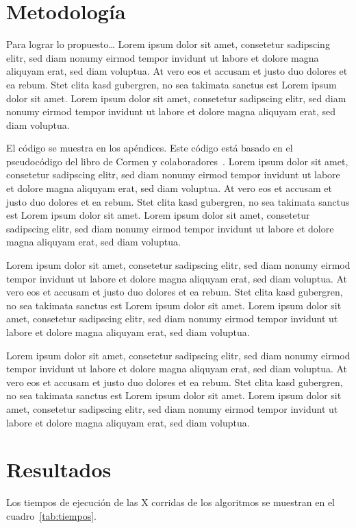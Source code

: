 \documentclass[twocolumn,english,spanish,journal]{IEEEtran}
\begin{document}
\section{Metodología}

Para lograr lo propuesto\ldots{} Lorem ipsum dolor sit amet, consetetur sadipscing elitr, sed diam nonumy eirmod tempor invidunt ut labore et dolore magna aliquyam erat, sed diam voluptua. At vero eos et accusam et justo duo dolores et ea rebum. Stet clita kasd gubergren, no sea takimata sanctus est Lorem ipsum dolor sit amet. Lorem ipsum dolor sit amet, consetetur sadipscing elitr, sed diam nonumy eirmod tempor invidunt ut labore et dolore magna aliquyam erat, sed diam voluptua.

El código se muestra en los apéndices. Este código está basado en el pseudocódigo del libro de Cormen y colaboradores~\cite{Cormen:2009}. Lorem ipsum dolor sit amet, consetetur sadipscing elitr, sed diam nonumy eirmod tempor invidunt ut labore et dolore magna aliquyam erat, sed diam voluptua. At vero eos et accusam et justo duo dolores et ea rebum. Stet clita kasd gubergren, no sea takimata sanctus est Lorem ipsum dolor sit amet. Lorem ipsum dolor sit amet, consetetur sadipscing elitr, sed diam nonumy eirmod tempor invidunt ut labore et dolore magna aliquyam erat, sed diam voluptua.

Lorem ipsum dolor sit amet, consetetur sadipscing elitr, sed diam nonumy eirmod tempor invidunt ut labore et dolore magna aliquyam erat, sed diam voluptua. At vero eos et accusam et justo duo dolores et ea rebum. Stet clita kasd gubergren, no sea takimata sanctus est Lorem ipsum dolor sit amet. Lorem ipsum dolor sit amet, consetetur sadipscing elitr, sed diam nonumy eirmod tempor invidunt ut labore et dolore magna aliquyam erat, sed diam voluptua.

Lorem ipsum dolor sit amet, consetetur sadipscing elitr, sed diam nonumy eirmod tempor invidunt ut labore et dolore magna aliquyam erat, sed diam voluptua. At vero eos et accusam et justo duo dolores et ea rebum. Stet clita kasd gubergren, no sea takimata sanctus est Lorem ipsum dolor sit amet. Lorem ipsum dolor sit amet, consetetur sadipscing elitr, sed diam nonumy eirmod tempor invidunt ut labore et dolore magna aliquyam erat, sed diam voluptua.


\section{Resultados}

Los tiempos de ejecución de las X corridas de los algoritmos se muestran en el cuadro~\ref{tab:tiempos}.
\end{document}
